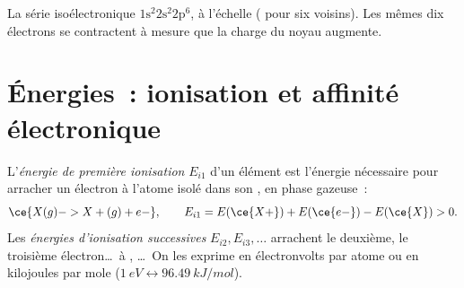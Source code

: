 \begin{omfigure}

{\small La série isoélectronique $1\text{s}^2 2\text{s}^2 2\text{p}^6$,
à l'échelle ( pour six voisins). Les mêmes dix électrons
se contractent à mesure que la charge du noyau augmente.}
\end{omfigure}

\section{Énergies~: ionisation et affinité électronique}

\begin{definition}\label{def:b1:periodicity:ionisation-energy}
L'\emph{énergie de première ionisation} $E_{i1}$
d'un élément est l'énergie nécessaire pour arracher un électron à
l'atome isolé dans son , en phase gazeuse~:
\[
  \ce{X(g) -> X+(g) + e-}, \qquad E_{i1} = E(\ce{X+}) + E(\ce{e-}) - E(\ce{X}) > 0 .
\]
Les \emph{énergies d'ionisation successives}
$E_{i2}, E_{i3}, \dots$ arrachent le deuxième, le troisième
électron\dots\ à , \dots\ On les exprime en
électronvolts par atome ou en kilojoules par mole
($\qty{1}{eV} \leftrightarrow \qty{96.49}{kJ/mol}$).
\end{definition}

